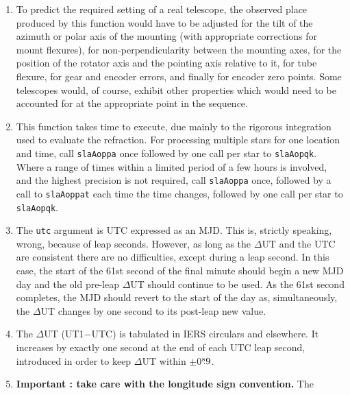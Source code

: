 \documentclass[11pt,fleqn,twoside]{article}
\renewcommand{\_}{{\tt\char'137}}     %
\newcommand{\tseci}[1]   {$#1$\mbox{$^{\rm s}$}}
\newcommand{\tsec}[2]    {\tseci{#1}$\hspace{-0.3em}.#2$}
\begin{document}
{\begin{enumerate}
        motion, and is the position that would be seen by a perfect
        equatorial located at the observer and with its polar axis
        aligned to the Earth's axis of rotation ({\it n.b.}\ not to the
        refracted pole).  Finally, the $\alpha$ is obtained by subtracting
        the {\it h}\/ from the local apparent ST.
  \item To predict the required setting of a real telescope, the
        observed place produced by this function would have to be
        adjusted for the tilt of the azimuth or polar axis of the
        mounting (with appropriate corrections for mount flexures),
        for non-perpendicularity between the mounting axes, for the
        position of the rotator axis and the pointing axis relative
        to it, for tube flexure, for gear and encoder errors, and
        finally for encoder zero points.  Some telescopes would, of
        course, exhibit other properties which would need to be
        accounted for at the appropriate point in the sequence.
  \item This function takes time to execute, due mainly to the
        rigorous integration used to evaluate the refraction.
        For processing multiple stars for one location and time,
        call {\tt slaAoppa} once followed by
        one call per star to {\tt slaAopqk}.
        Where a range of times within a limited period of a few hours
        is involved, and the highest precision is not required, call
        {\tt slaAoppa} once, followed by a call
        to {\tt slaAoppat} each time the
        time changes, followed by one call per star to {\tt slaAopqk}.
  \item The {\tt utc} argument is UTC expressed as an MJD.  This is,
        strictly speaking, wrong, because of leap seconds.  However,
        as long as the $\Delta$UT and the UTC are consistent there
        are no difficulties, except during a leap second.  In this
        case, the start of the 61st second of the final minute should
        begin a new MJD day and the old pre-leap $\Delta$UT should
        continue to be used.  As the 61st second completes, the MJD
        should revert to the start of the day as, simultaneously,
        the $\Delta$UT changes by one second to its post-leap new value.
  \item The $\Delta$UT (UT1$-$UTC) is tabulated in IERS circulars and
        elsewhere.  It increases by exactly one second at the end of
        each UTC leap second, introduced in order to keep $\Delta$UT
        within $\pm$\tsec{0}{9}.
  \item {\bf Important : take care with the longitude sign convention.}  The

\end{enumerate}}
\end{document}
